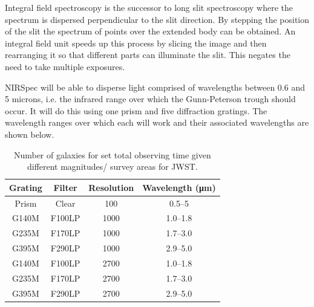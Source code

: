 			Integral field spectroscopy is the successor to long slit spectroscopy where the spectrum is dispersed perpendicular to the slit direction. By stepping the position of the slit the spectrum of points over the extended body can be obtained. An integral field unit speeds up this process by slicing the image and then rearranging it so that different parts can illuminate the slit. This negates the need to take multiple exposures\cite{IntegralJWST}\cite{IntegralSpec}.

			NIRSpec will be able to disperse light comprised of wavelengths between 0.6 and 5 microns, i.e. the infrared range over which the Gunn-Peterson trough should occur. It will do this using one prism and five diffraction gratings. The wavelength ranges over which each will work and their associated wavelengths are shown below\cite{JWSTnumbers}.
			\begin{table}[htbp]
				\begin{center}
					\begin{tabular}{c|c|c|c}
						Grating & Filter & Resolution & Wavelength (\si{\micro\metre}) \\
						\hline \hline
						Prism & Clear & 100 & 0.5--5 \\
						G140M & F100LP & 1000 & 1.0--1.8 \\
						G235M & F170LP & 1000 & 1.7--3.0 \\
						G395M & F290LP & 1000 & 2.9--5.0 \\
						G140M & F100LP & 2700 & 1.0--1.8 \\
						G235M & F170LP & 2700 & 1.7--3.0 \\
						G395M & F290LP & 2700 & 2.9--5.0
					\end{tabular}
				\end{center}
				\caption{Number of galaxies for set total observing time given different magnitudes/ survey areas for JWST.\label{tab:galaxies_for_set_total_observing_time_JWST}}
			\end{table}

